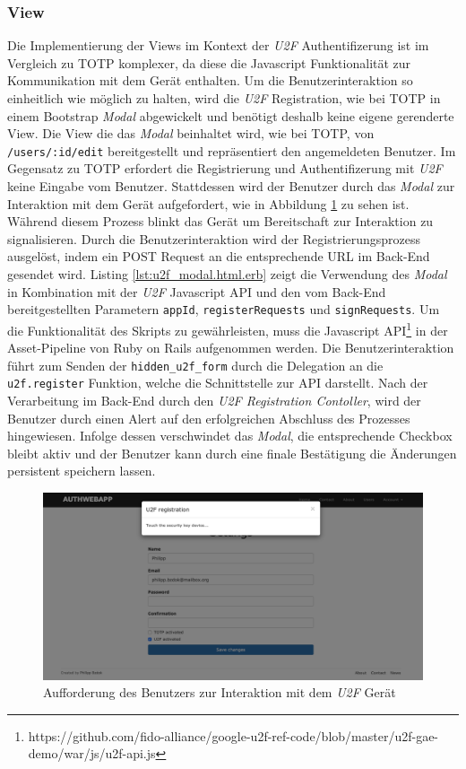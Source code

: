 \documentclass[11pt,a4paper,ngerman]{scrreprt}
\begin{document}
\subsubsection{View}
Die Implementierung der Views im Kontext der \textit{U2F} Authentifizerung ist im Vergleich zu TOTP  komplexer, da diese die Javascript Funktionalität zur Kommunikation mit dem Gerät enthalten. Um die Benutzerinteraktion so einheitlich wie möglich zu halten, wird die \textit{U2F} Registration, wie bei TOTP in einem Bootstrap \textit{Modal} abgewickelt und benötigt deshalb keine eigene gerenderte View. Die View die das \textit{Modal} beinhaltet wird, wie bei TOTP, von \texttt{/users/:id/edit} bereitgestellt und repräsentiert den angemeldeten Benutzer. Im Gegensatz zu TOTP erfordert die Registrierung und Authentifizerung mit \textit{U2F} keine Eingabe vom Benutzer. Stattdessen wird der Benutzer durch das \textit{Modal} zur Interaktion mit dem Gerät aufgefordert, wie in Abbildung \ref{fig:Authwebapp_u2f_reg} zu sehen ist. Während diesem Prozess blinkt das Gerät um Bereitschaft zur Interaktion zu signalisieren. Durch die Benutzerinteraktion wird der Registrierungsprozess ausgelöst, indem ein POST Request an die entsprechende URL im Back-End gesendet wird. Listing \ref{lst:u2f_modal.html.erb} zeigt die Verwendung des \textit{Modal} in Kombination mit der \textit{U2F} Javascript API und den vom Back-End bereitgestellten Parametern \texttt{appId}, \texttt{registerRequests} und \texttt{signRequests}. Um die Funktionalität des Skripts zu gewährleisten, muss die Javascript API\footnote{https://github.com/fido-alliance/google-u2f-ref-code/blob/master/u2f-gae-demo/war/js/u2f-api.js} in der Asset-Pipeline von Ruby on Rails aufgenommen werden. Die Benutzerinteraktion führt zum Senden der \texttt{hidden\_u2f\_form} durch die Delegation an die \texttt{u2f.register} Funktion, welche die Schnittstelle zur API darstellt. Nach der Verarbeitung im Back-End durch den \textit{U2F Registration Contoller}, wird der Benutzer durch einen Alert auf den erfolgreichen Abschluss des Prozesses hingewiesen. Infolge dessen verschwindet das \textit{Modal}, die entsprechende Checkbox bleibt aktiv und der Benutzer kann durch eine finale Bestätigung die Änderungen persistent speichern lassen.
\begin{figure}[htbp]
    \centering
        \includegraphics[width=\textwidth]{Abbildungen/Authwebapp_U2F_Registrierung}
    \caption{Aufforderung des Benutzers zur Interaktion mit dem \textit{U2F} Gerät}
    \label{fig:Authwebapp_u2f_reg}
\end{figure}
\end{document}
